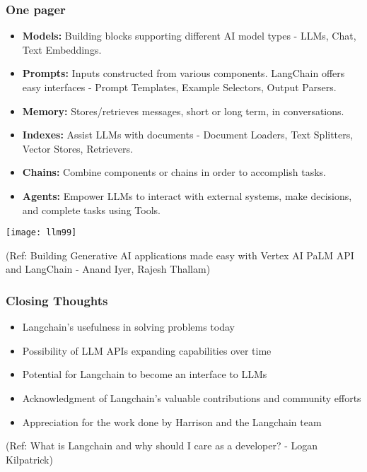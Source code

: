 \begin{frame}[fragile]\frametitle{One pager}

\begin{itemize}
\item \textbf{Models:} Building blocks supporting different AI model types - LLMs, Chat, Text Embeddings.
\item \textbf{Prompts:} Inputs constructed from various components. LangChain offers easy interfaces - Prompt Templates, Example Selectors, Output Parsers.
\item \textbf{Memory:} Stores/retrieves messages, short or long term, in conversations.
\item \textbf{Indexes:} Assist LLMs with documents - Document Loaders, Text Splitters, Vector Stores, Retrievers.
\item \textbf{Chains:} Combine components or chains in order to accomplish tasks.
\item \textbf{Agents:} Empower LLMs to interact with external systems, make decisions, and complete tasks using Tools.
\end{itemize}

\begin{center}
\texttt{[image: llm99]}
\end{center}


{\tiny (Ref: Building Generative AI applications made easy with Vertex AI PaLM API and LangChain  - Anand Iyer, Rajesh Thallam)}

\end{frame}


\begin{frame}[fragile]\frametitle{Closing Thoughts}

\begin{itemize}
\item Langchain's usefulness in solving problems today
\item Possibility of LLM APIs expanding capabilities over time
\item Potential for Langchain to become an interface to LLMs
\item Acknowledgment of Langchain's valuable contributions and community efforts
\item Appreciation for the work done by Harrison and the Langchain team
\end{itemize}

{\tiny (Ref: What is Langchain and why should I care as a developer? - Logan Kilpatrick)}

\end{frame}
